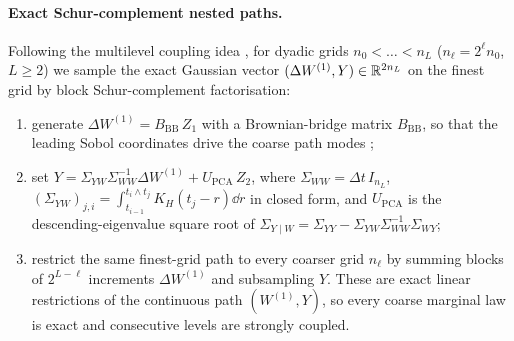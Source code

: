 \paragraph{Exact Schur-complement nested paths.}
Following the multilevel coupling idea \citep{Giles2015MLMC}, for dyadic grids $n_0 < \dots < n_L$ ($n_\ell = 2^\ell n_0$, $L\ge 2$) we sample the exact Gaussian vector $(\Delta W^{(1)}, Y)\in\mathbb{R}^{2n_L}$ on the finest grid by block Schur-complement factorisation:
\begin{enumerate}[1.]
  \item generate $\Delta W^{(1)}=B_{\mathrm{BB}}\,Z_1$ with a Brownian-bridge matrix $B_{\mathrm{BB}}$, so that the leading Sobol coordinates drive the coarse path modes \citep{BayerBenHammoudaTempone2020};
  \item set $Y = \Sigma_{YW}\Sigma_{WW}^{-1}\Delta W^{(1)} + U_{\mathrm{PCA}}\,Z_2$, where $\Sigma_{WW}=\Delta t\,I_{n_L}$, $(\Sigma_{YW})_{j,i}=\int_{t_{i-1}}^{t_i\wedge t_j} K_H(t_j-r)\dd r$ in closed form, and $U_{\mathrm{PCA}}$ is the descending-eigenvalue square root of $\Sigma_{Y\mid W}=\Sigma_{YY}-\Sigma_{YW}\Sigma_{WW}^{-1}\Sigma_{WY}$;
  \item restrict the same finest-grid path to every coarser grid $n_\ell$ by summing blocks of $2^{L-\ell}$ increments $\Delta W^{(1)}$ and subsampling $Y$. These are exact linear restrictions of the continuous path $(W^{(1)},Y)$, so every coarse marginal law is exact and consecutive levels are strongly coupled.
\end{enumerate}

